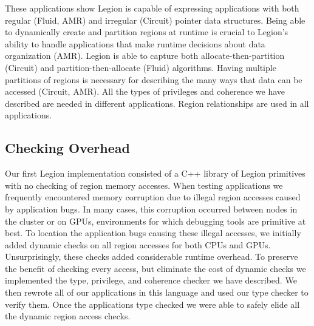 These applications show Legion is capable of 
expressing applications with both regular (Fluid, AMR) and irregular (Circuit) pointer data structures.
Being able to dynamically create and partition regions at runtime is crucial to Legion's
ability to handle applications that make runtime decisions about data organization (AMR).  Legion
is able to capture both allocate-then-partition (Circuit) and partition-then-allocate (Fluid) algorithms. 
Having multiple partitions of regions is necessary for describing the many ways 
that data can be accessed (Circuit, AMR).  All the types of privileges and coherence we have
described are needed in different applications.  Region relationships
are used in all applications. %

\subsection{Checking Overhead}
\label{subsec:overhead}
Our first Legion implementation consisted of a C++ library of Legion primitives
\cite{Legion12} with no checking of region memory accesses.  
When testing applications we frequently encountered memory corruption due to
illegal region accesses caused by application bugs.
In many cases, this corruption occurred between nodes in the cluster or on 
GPUs, environments for which debugging tools are primitive at best.
To location the application bugs causing these illegal accesses, we initially added 
dynamic checks on  all region accesses for both CPUs and GPUs.  
Unsurprisingly, these checks added considerable runtime overhead.  
To preserve the benefit of checking every access, but eliminate the cost of dynamic checks we implemented the type, privilege, and coherence checker we have described. 
We then rewrote all of our applications in this language and used our type checker to verify them.  Once the applications type checked we were
able to safely elide all the dynamic region access checks.


